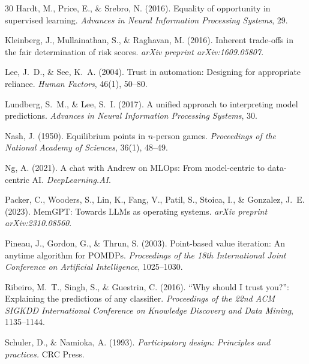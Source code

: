 \documentclass[11pt,a4paper]{article}
\begin{document}
\begin{thebibliography}{30}
Hardt, M., Price, E., \& Srebro, N. (2016).
\newblock Equality of opportunity in supervised learning.
\newblock \emph{Advances in Neural Information Processing Systems}, 29.

Kleinberg, J., Mullainathan, S., \& Raghavan, M. (2016).
\newblock Inherent trade-offs in the fair determination of risk scores.
\newblock \emph{arXiv preprint arXiv:1609.05807}.

Lee, J.~D., \& See, K.~A. (2004).
\newblock Trust in automation: Designing for appropriate reliance.
\newblock \emph{Human Factors}, 46(1), 50--80.

Lundberg, S.~M., \& Lee, S.~I. (2017).
\newblock A unified approach to interpreting model predictions.
\newblock \emph{Advances in Neural Information Processing Systems}, 30.

Nash, J. (1950).
\newblock Equilibrium points in $n$-person games.
\newblock \emph{Proceedings of the National Academy of Sciences}, 36(1), 48--49.

Ng, A. (2021).
\newblock A chat with Andrew on MLOps: From model-centric to data-centric AI.
\newblock \emph{DeepLearning.AI}.

Packer, C., Wooders, S., Lin, K., Fang, V., Patil, S., Stoica, I., \& Gonzalez, J.~E. (2023).
\newblock MemGPT: Towards LLMs as operating systems.
\newblock \emph{arXiv preprint arXiv:2310.08560}.

Pineau, J., Gordon, G., \& Thrun, S. (2003).
\newblock Point-based value iteration: An anytime algorithm for POMDPs.
\newblock \emph{Proceedings of the 18th International Joint Conference on Artificial Intelligence}, 1025--1030.

Ribeiro, M.~T., Singh, S., \& Guestrin, C. (2016).
\newblock ``Why should I trust you?'': Explaining the predictions of any classifier.
\newblock \emph{Proceedings of the 22nd ACM SIGKDD International Conference on Knowledge Discovery and Data Mining}, 1135--1144.

Schuler, D., \& Namioka, A. (1993).
\newblock \emph{Participatory design: Principles and practices.}
\newblock CRC Press.


\end{thebibliography}
\end{document}
